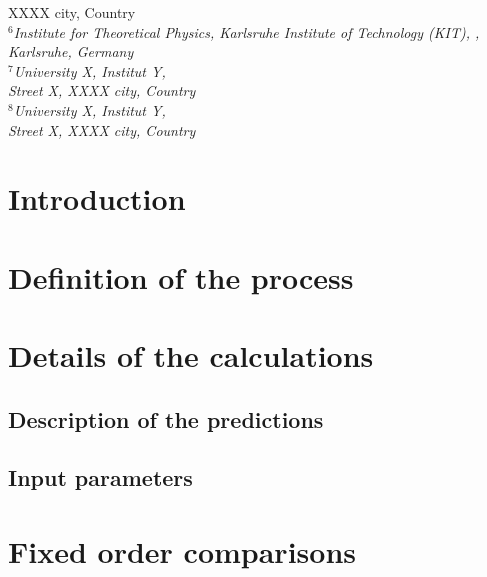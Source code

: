 \documentclass[11pt,epsf]{article}
\begin{document}
{{        XXXX city, %
        Country}\\[3mm]
{\small\it
$^6$Institute for Theoretical Physics, Karlsruhe Institute of
Technology (KIT), 
,} \\ %
{\small\it Karlsruhe, Germany}\\[3mm]
{\small\it
$^7$University X, %
        Institut Y,} \\ %
{\small\it Street X, \linebreak %
        XXXX city, %
        Country}\\[3mm]
{\small\it
$^8$University X, %
        Institut Y,} \\ %
{\small\it Street X, \linebreak %
        XXXX city, %
        Country}\\[3mm]
        }


\maketitle

\newpage



\section{Introduction}



\section{Definition of the process}

\section{Details of the calculations}

\subsection{Description of the predictions}



\subsection{Input parameters}



\section{Fixed order comparisons}
\end{document}
